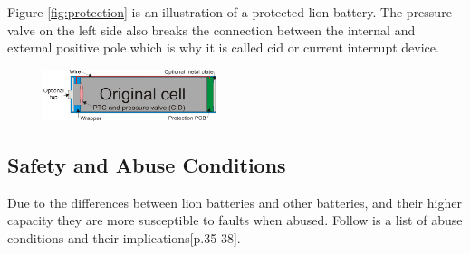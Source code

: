 Figure \autoref{fig:protection} is an illustration of a protected \gls{lion} battery. The pressure valve on the left side also breaks the connection between the internal and external positive pole which is why it is called \gls{cid} or current interrupt device.

\begin{figure}[H]
	\centering
	\includegraphics[width=0.45\textwidth]{Figures/protection.png}
	\label{fig:protection}
\end{figure}

\subsection{Safety and Abuse Conditions}
Due to the differences between \gls{lion} batteries and other batteries, and their higher capacity they are more susceptible to faults when abused. Follow is a list of abuse conditions and their implications\cite{book}[p.35-38].

